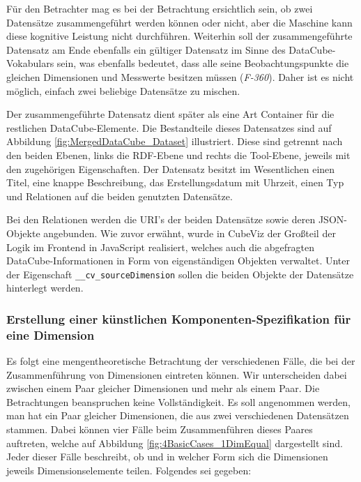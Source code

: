 \documentclass[11pt]{article}
\newcommand{\com}[1]{\marginpar{\em {\small{#1}}}} %
\begin{document}
\newpage
\noindent
Für den Betrachter mag es bei der Betrachtung ersichtlich sein, ob zwei Datensätze zusammengeführt werden können oder nicht, aber die Maschine kann diese kognitive Leistung nicht durchführen. Weiterhin soll der zusammengeführte Datensatz am Ende ebenfalls ein gültiger Datensatz im Sinne des DataCube-Vokabulars sein, was ebenfalls bedeutet, dass alle seine Beobachtungspunkte\com{Anforderung \\ F-360, S. \pageref{req:F360}} die gleichen Dimensionen und Messwerte besitzen müssen (\textit{F-360})\label{req:F360source}. Daher ist es nicht möglich, einfach zwei beliebige Datensätze zu mischen.

Der zusammengeführte Datensatz dient später als eine Art Container für die restlichen DataCube-Elemente. Die Bestandteile dieses Datensatzes sind auf Abbildung \ref{fig:MergedDataCube_Dataset} illustriert. Diese sind getrennt nach den beiden Ebenen, links die RDF-Ebene und rechts die Tool-Ebene, jeweils mit den zugehörigen Eigenschaften. Der Datensatz besitzt im Wesentlichen einen Titel, eine knappe Beschreibung, das Erstellungsdatum mit Uhrzeit, einen Typ und Relationen auf die beiden genutzten Datensätze.

Bei den Relationen werden die URI's der beiden Datensätze sowie deren JSON-Objekte angebunden. Wie zuvor erwähnt, wurde in CubeViz der Großteil der Logik im Frontend in JavaScript realisiert, welches auch die abgefragten DataCube-Informationen in Form von eigenständigen Objekten verwaltet. Unter der Eigenschaft \verb|__cv_sourceDimension| sollen die beiden Objekte der Datensätze hinterlegt werden.

%
%
\subsubsection{Erstellung einer künstlichen Komponenten-Spezifikation für eine Dimension}
\label{sec:chapter_mergeDimensions}

Es folgt eine mengentheoretische Betrachtung der verschiedenen Fälle, die bei der Zusammenführung von Dimensionen eintreten können. Wir unterscheiden dabei zwischen einem Paar gleicher Dimensionen und mehr als einem Paar. Die Betrachtungen beanspruchen keine Vollständigkeit. Es soll angenommen werden, man hat ein Paar gleicher Dimensionen, die aus zwei verschiedenen Datensätzen stammen. Dabei können vier Fälle beim Zusammenführen dieses Paares auftreten, welche auf Abbildung \ref{fig:4BasicCases_1DimEqual} dargestellt sind. Jeder dieser Fälle beschreibt, ob und in welcher Form sich die Dimensionen jeweils Dimensionselemente teilen. Folgendes sei gegeben:
\end{document}
